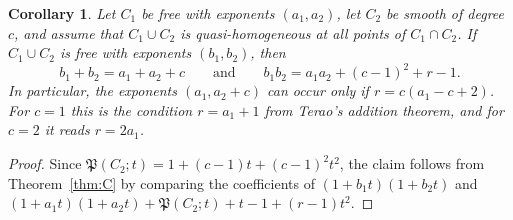 \documentclass[11pt]{amsart}
\newtheorem{corollary}[theorem]{Corollary}
\theoremstyle{definition}
\numberwithin{equation}{section}
\newcommand{\Pfrak}{\mathfrak{P}}
\begin{document}
\begin{corollary}\label{cor:addfree}
Let $C_1$ be free with exponents $(a_1,a_2)$, let $C_2$ be smooth of degree $c$, and assume that $C_1\cup C_2$ is quasi-homogeneous at all points of $C_1\cap C_2$.
If $C_1\cup C_2$ is free with exponents $(b_1,b_2)$, then
\[
b_1+b_2=a_1+a_2+c\qquad\text{and}\qquad b_1b_2=a_1a_2+(c-1)^2+r-1 .
\]
In particular, the exponents $(a_1,a_2+c)$ can occur only if $r=c(a_1-c+2)$.
For $c=1$ this is the condition $r=a_1+1$ from Terao's addition theorem, and for $c=2$ it reads $r=2a_1$.
\end{corollary}

\begin{proof}
Since $\Pfrak(C_2;t)=1+(c-1)t+(c-1)^2t^2$, the claim follows from Theorem~\ref{thm:C} by comparing the coefficients of $(1+b_1t)(1+b_2t)$ and $(1+a_1t)(1+a_2t)+\Pfrak(C_2;t)+t-1+(r-1)t^2$.
\end{proof}
\end{document}
